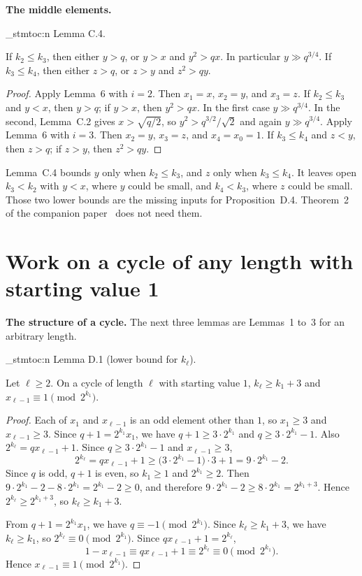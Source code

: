 \documentclass[11pt]{article}
\newenvironment{named}[1]{%
  \par\addvspace{\medskipamount}%
  \pagebreak[3]%
  \noindent{\bfseries #1}\space\ignorespaces
  \stmtoc{#1}%
}{\par\addvspace{\medskipamount}}
\newcommand{\topic}[1]{\par\noindent\textbf{#1}}
\newcommand{\stmtoc}[1]{ \qn_stmtoc:n {#1} }
\begin{document}
\topic{The middle elements.}

\begin{named}{Lemma C.4.}
If $k_2 \le k_3$, then either $y > q$, or $y > x$ and $y^2 > qx$.
In particular $y \gg q^{3/4}$.
If $k_3 \le k_4$, then either $z > q$, or $z > y$ and $z^2 > qy$.
\end{named}

\begin{proof}
Apply Lemma~6 with $i = 2$. Then $x_1 = x$, $x_2 = y$, and $x_3 = z$.
If $k_2 \le k_3$ and $y < x$, then $y > q$; if $y > x$, then $y^2 > qx$.
In the first case $y \gg q^{3/4}$.
In the second, Lemma~C.2 gives $x > \sqrt{q/2}$, so $y^2 > q^{3/2}/\sqrt{2}$ and again $y \gg q^{3/4}$.
Apply Lemma~6 with $i = 3$. Then $x_2 = y$, $x_3 = z$, and $x_4 = x_0 = 1$.
If $k_3 \le k_4$ and $z < y$, then $z > q$; if $z > y$, then $z^2 > qy$.
\end{proof}

Lemma~C.4 bounds $y$ only when $k_2 \le k_3$, and $z$ only when $k_3 \le k_4$.
It leaves open $k_3 < k_2$ with $y < x$, where $y$ could be small, and $k_4 < k_3$, where $z$ could be small.
Those two lower bounds are the missing inputs for Proposition~D.4.
Theorem~2 of the companion paper~\cite{hackman-ii} does not need them.

\section{Work on a cycle of any length with starting value 1}
\label{app:any}

\topic{The structure of a cycle.}
The next three lemmas are Lemmas~1 to~3 for an arbitrary length.

\begin{named}{Lemma D.1 (lower bound for $k_\ell$).}
Let $\ell \ge 2$.
On a cycle of length $\ell$ with starting value $1$, $k_\ell \ge k_1 + 3$ and $x_{\ell-1} \equiv 1 \pmod{2^{k_1}}$.
\end{named}

\begin{proof}
Each of $x_1$ and $x_{\ell-1}$ is an odd element other than $1$, so $x_1 \ge 3$ and $x_{\ell-1} \ge 3$.
Since $q + 1 = 2^{k_1} x_1$, we have $q + 1 \ge 3 \cdot 2^{k_1}$ and $q \ge 3 \cdot 2^{k_1} - 1$.
Also $2^{k_\ell} = q x_{\ell-1} + 1$.
Since $q \ge 3 \cdot 2^{k_1} - 1$ and $x_{\ell-1} \ge 3$,
\[
2^{k_\ell} = q x_{\ell-1} + 1 \ge \bigl(3 \cdot 2^{k_1} - 1\bigr) \cdot 3 + 1 = 9 \cdot 2^{k_1} - 2.
\]
Since $q$ is odd, $q + 1$ is even, so $k_1 \ge 1$ and $2^{k_1} \ge 2$.
Then $9 \cdot 2^{k_1} - 2 - 8 \cdot 2^{k_1} = 2^{k_1} - 2 \ge 0$, and therefore $9 \cdot 2^{k_1} - 2 \ge 8 \cdot 2^{k_1} = 2^{k_1 + 3}$.
Hence $2^{k_\ell} \ge 2^{k_1 + 3}$, so $k_\ell \ge k_1 + 3$.

From $q + 1 = 2^{k_1} x_1$, we have $q \equiv -1 \pmod{2^{k_1}}$.
Since $k_\ell \ge k_1 + 3$, we have $k_\ell \ge k_1$, so $2^{k_\ell} \equiv 0 \pmod{2^{k_1}}$.
Since $q x_{\ell-1} + 1 = 2^{k_\ell}$,
\[
1 - x_{\ell-1} \equiv q x_{\ell-1} + 1 \equiv 2^{k_\ell} \equiv 0 \pmod{2^{k_1}}.
\]
Hence $x_{\ell-1} \equiv 1 \pmod{2^{k_1}}$.
\end{proof}
\end{document}
